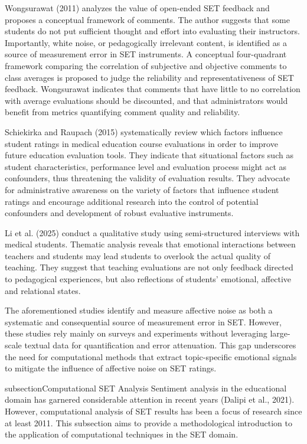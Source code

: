 Wongsurawat (2011) analyzes the value of open-ended SET feedback and proposes a conceptual framework of comments. The author suggests that some students do not put sufficient thought and effort into evaluating their instructors. Importantly, white noise, or pedagogically irrelevant content, is identified as a source of measurement error in SET instruments. A conceptual four-quadrant framework comparing the correlation of subjective and objective comments to class averages is proposed to judge the reliability and representativeness of SET feedback. Wongsurawat indicates that comments that have little to no correlation with average evaluations should be discounted, and that administrators would benefit from metrics quantifying comment quality and reliability.

Schiekirka and Raupach (2015) systematically review which factors influence student ratings in medical education course evaluations in order to improve future education evaluation tools. They indicate that situational factors such as student characteristics, performance level and evaluation process might act as confounders, thus threatening the validity of evaluation results. They advocate for administrative awareness on the variety of factors that influence student ratings and encourage additional research into the control of potential confounders and development of robust evaluative instruments.

Li et al. (2025) conduct a qualitative study using semi-structured interviews with medical students. Thematic analysis reveals that emotional interactions between teachers and students may lead students to overlook the actual quality of teaching. They suggest that teaching evaluations are not only feedback directed to pedagogical experiences, but also reflections of students’ emotional, affective and relational states.

The aforementioned studies identify and measure affective noise as both a systematic and consequential source of measurement error in SET. However, these studies rely mainly on surveys and experiments without leveraging large-scale textual data for quantification and error attenuation. This gap underscores the need for computational methods that extract topic-specific emotional signals to mitigate the influence of affective noise on SET ratings.

subsection{Computational SET Analysis}
Sentiment analysis in the educational domain has garnered considerable attention in recent years (Dalipi et al., 2021). However, computational analysis of SET results has been a focus of research since at least 2011. This subsection aims to provide a methodological introduction to the application of computational techniques in the SET domain.

